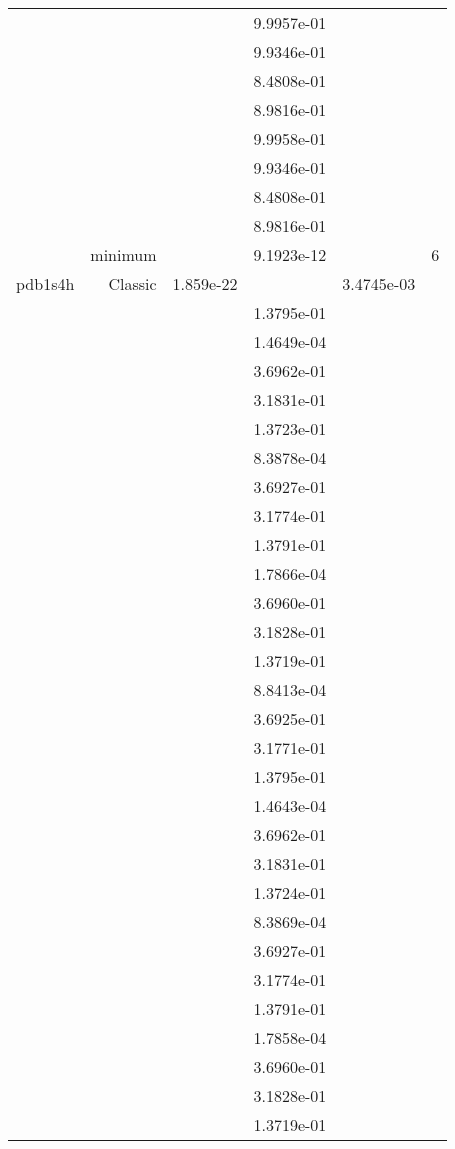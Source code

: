 \begin{xltabular}{\textwidth}{r|rS[table-format=1.3e+2]S[table-format=1.4e+2]S[table-format=1.4e+2]S[table-format=-1.5]}
&  &  & 9.9957e-01 & & \\
&  &  & 9.9346e-01 & & \\
&  &  & 8.4808e-01 & & \\
&  &  & 8.9816e-01 & & \\
&  &  & 9.9958e-01 & & \\
&  &  & 9.9346e-01 & & \\
&  &  & 8.4808e-01 & & \\
&  &  & 8.9816e-01 & & \\
& minimum &  & 9.1923e-12 & & 6 \\  \addlinespace
pdb1s4h & Classic & 1.859e-22 &  & 3.4745e-03 & \\
&  &  & 1.3795e-01 & & \\
&  &  & 1.4649e-04 & & \\
&  &  & 3.6962e-01 & & \\
&  &  & 3.1831e-01 & & \\
&  &  & 1.3723e-01 & & \\
&  &  & 8.3878e-04 & & \\
&  &  & 3.6927e-01 & & \\
&  &  & 3.1774e-01 & & \\
&  &  & 1.3791e-01 & & \\
&  &  & 1.7866e-04 & & \\
&  &  & 3.6960e-01 & & \\
&  &  & 3.1828e-01 & & \\
&  &  & 1.3719e-01 & & \\
&  &  & 8.8413e-04 & & \\
&  &  & 3.6925e-01 & & \\
&  &  & 3.1771e-01 & & \\
&  &  & 1.3795e-01 & & \\
&  &  & 1.4643e-04 & & \\
&  &  & 3.6962e-01 & & \\
&  &  & 3.1831e-01 & & \\
&  &  & 1.3724e-01 & & \\
&  &  & 8.3869e-04 & & \\
&  &  & 3.6927e-01 & & \\
&  &  & 3.1774e-01 & & \\
&  &  & 1.3791e-01 & & \\
&  &  & 1.7858e-04 & & \\
&  &  & 3.6960e-01 & & \\
&  &  & 3.1828e-01 & & \\
&  &  & 1.3719e-01 & & \\

\end{xltabular}

